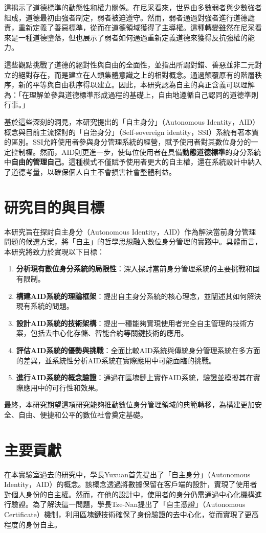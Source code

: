 這揭示了道德標準的動態性和權力關係。在尼采看來，世界由多數弱者與少數強者組成，道德最初由強者制定，弱者被迫遵守。然而，弱者通過對強者進行道德譴責，重新定義了善惡標準，從而在道德領域獲得了主導權。這種轉變雖然在尼采看來是一種道德墮落，但也展示了弱者如何通過重新定義道德來獲得反抗強權的能力。

這些觀點挑戰了道德的絕對性與自由的全面性，並指出所謂對錯、善惡並非二元對立的絕對存在，而是建立在人類集體意識之上的相對概念。通過顛覆原有的階層秩序，新的平等與自由秩序得以建立。因此，本研究認為自主的真正含義可以理解為：「在理解並參與道德標準形成過程的基礎上，自由地遵循自己認同的道德準則行事。」

基於這些深刻的洞見，本研究提出的「自主身分」（Autonomous Identity，AID）概念與目前主流探討的「自治身分」（Self-sovereign identity，SSI）系統有著本質的區別。SSI允許使用者參與身分管理系統的經營，賦予使用者對其數位身分的一定控制權。然而，AID則更進一步，使每位使用者在具備\textbf{動態道德標準}的身分系統中\textbf{自由的管理自己}。這種模式不僅賦予使用者更大的自主權，還在系統設計中納入了道德考量，以確保個人自主不會損害社會整體利益。
\section{研究目的與目標}
本研究旨在探討自主身分（Autonomous Identity，AID）作為解決當前身分管理問題的候選方案，將「自主」的哲學思想融入數位身分管理的實踐中。具體而言，本研究將致力於實現以下目標：
\begin{enumerate}
  \item \textbf{分析現有數位身分系統的局限性}：深入探討當前身分管理系統的主要挑戰和固有限制。
  \item \textbf{構建AID系統的理論框架}：提出自主身分系統的核心理念，並闡述其如何解決現有系統的問題。
  \item \textbf{設計AID系統的技術架構}：提出一種能夠實現使用者完全自主管理的技術方案，包括去中心化存儲、智能合約等關鍵技術的應用。
  \item \textbf{評估AID系統的優勢與挑戰}：全面比較AID系統與傳統身分管理系統在多方面的差異，並系統性分析AID系統在實際應用中可能面臨的挑戰。
  \item \textbf{進行AID系統的概念驗證}：通過在區塊鏈上實作AID系統，驗證並模擬其在實際應用中的可行性和效果。
\end{enumerate}
最終，本研究期望這項研究能夠推動數位身分管理領域的典範轉移，為構建更加安全、自由、便捷和公平的數位社會奠定基礎。
\section{主要貢獻}
在本實驗室過去的研究中，學長Yuxuan\cite{ntu-lin2014autonomous}首先提出了「自主身分」（Autonomous Identity，AID）的概念。該概念透過將數據保留在客戶端的設計，實現了使用者對個人身份的自主權。然而，在他的設計中，使用者的身分仍需通過中心化機構進行驗證。為了解決這一問題，學長Tze-Nan\cite{NTU202102846}提出了「自主憑證」（Autonomous Certificate）機制，利用區塊鏈技術確保了身份驗證的去中心化，從而實現了更高程度的身份自主。

